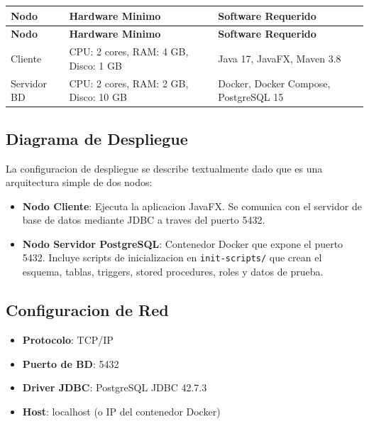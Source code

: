\documentclass[12pt,a4paper]{article}
\begin{document}
\begin{longtable}{|p{3cm}|p{5cm}|p{6cm}|}
\hline
\rowcolor{udgreen!20}
\textbf{Nodo} & \textbf{Hardware Minimo} & \textbf{Software Requerido} \\
\hline
\endfirsthead
\hline
\rowcolor{udgreen!20}
\textbf{Nodo} & \textbf{Hardware Minimo} & \textbf{Software Requerido} \\
\hline
\endhead
Cliente & CPU: 2 cores, RAM: 4 GB, Disco: 1 GB & Java 17, JavaFX, Maven 3.8 \\
\hline
Servidor BD & CPU: 2 cores, RAM: 2 GB, Disco: 10 GB & Docker, Docker Compose, PostgreSQL 15 \\
\hline
\end{longtable}

\subsection{Diagrama de Despliegue}

La configuracion de despliegue se describe textualmente dado que es una arquitectura simple de dos nodos:

\begin{itemize}
    \item \textbf{Nodo Cliente}: Ejecuta la aplicacion JavaFX. Se comunica con el servidor de base de datos mediante JDBC a traves del puerto 5432.
    \item \textbf{Nodo Servidor PostgreSQL}: Contenedor Docker que expone el puerto 5432. Incluye scripts de inicializacion en \texttt{init-scripts/} que crean el esquema, tablas, triggers, stored procedures, roles y datos de prueba.
\end{itemize}

\subsection{Configuracion de Red}

\begin{itemize}
    \item \textbf{Protocolo}: TCP/IP
    \item \textbf{Puerto de BD}: 5432
    \item \textbf{Driver JDBC}: PostgreSQL JDBC 42.7.3
    \item \textbf{Host}: localhost (o IP del contenedor Docker)
\end{itemize}

\newpage
\end{document}
